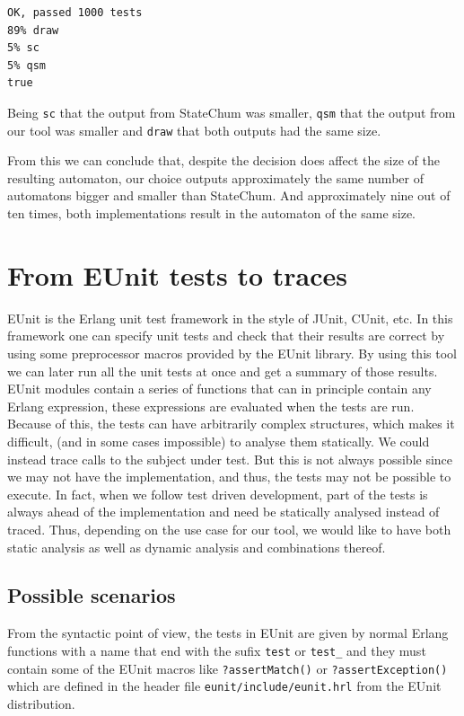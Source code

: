\documentclass[]{sigplanconf}
\begin{document}
\begin{verbatim}
OK, passed 1000 tests
89% draw
5% sc
5% qsm
true
\end{verbatim}

Being \texttt{sc} that the output from StateChum was smaller, \texttt{qsm}
that the output from our tool was smaller and \texttt{draw} that both
outputs had the same size.

From this we can conclude that, despite the decision does affect the size of
the resulting automaton, our choice
outputs approximately the same number of automatons bigger and smaller than
StateChum. And approximately nine out of ten times, both implementations result
in the automaton of the same size.


\section{From EUnit tests to traces}
\label{EunitToTraces}

EUnit \cite{eunit,eunit_user_guide} is the Erlang unit test framework in the
style of JUnit, CUnit, etc. In this framework one can specify unit tests
and check that their results are correct by using some preprocessor macros
provided by the EUnit library. By using this tool we can later run all
the unit tests at once and get a summary of those results.
EUnit modules contain a series of functions that can in principle
contain any Erlang expression, these expressions are
evaluated when the tests are run. Because of this, the tests
can have arbitrarily complex structures, which makes it difficult, (and
in some cases impossible) to analyse them statically. We could instead
trace calls to the subject under test. But this is not always possible since we may not have
the implementation, and thus, the tests may not be possible to execute.
In fact, when we follow test driven development, part of the tests is always ahead
of the implementation and need be statically analysed instead of traced.
Thus, depending on the use case for our tool, we would
like to have both static analysis as well as dynamic analysis and combinations
thereof. 

\subsection{Possible scenarios}

From the syntactic point of view, the tests in EUnit are given by
normal Erlang functions with a name that end with the sufix \texttt{test}
or \texttt{test\_} and they must contain some of the EUnit macros
like \texttt{?assertMatch()} or \texttt{?assertException()} which are
defined in the header file \texttt{eunit/include/eunit.hrl} from the
EUnit distribution.
\end{document}
